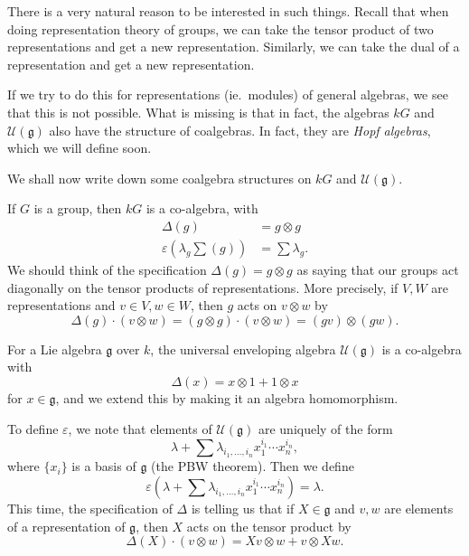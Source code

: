 \documentclass[a4paper]{article}
\begin{document}
There is a very natural reason to be interested in such things. Recall that when doing representation theory of groups, we can take the tensor product of two representations and get a new representation. Similarly, we can take the dual of a representation and get a new representation.

If we try to do this for representations (ie.\ modules) of general algebras, we see that this is not possible. What is missing is that in fact, the algebras $kG$ and $\mathcal{U}(\mathfrak{g})$ also have the structure of coalgebras. In fact, they are \emph{Hopf algebras}, which we will define soon.

We shall now write down some coalgebra structures on $kG$ and $\mathcal{U}(\mathfrak{g})$.
\begin{eg}
  If $G$ is a group, then $kG$ is a co-algebra, with
  \begin{align*}
    \Delta(g) &= g \otimes g\\
    \varepsilon\left(\lambda_g \sum(g)\right) &= \sum \lambda_g.
  \end{align*}
  We should think of the specification $\Delta (g) = g \otimes g$ as saying that our groups act diagonally on the tensor products of representations. More precisely, if $V, W$ are representations and $v \in V, w \in W$, then $g$ acts on $v \otimes w$ by
  \[
    \Delta(g) \cdot (v \otimes w) = (g \otimes g) \cdot (v \otimes w) = (gv) \otimes (gw).
  \]
\end{eg}

\begin{eg}
  For a Lie algebra $\mathfrak{g}$ over $k$, the universal enveloping algebra $\mathcal{U}(\mathfrak{g})$ is a co-algebra with
  \[
    \Delta(x) = x \otimes 1 + 1 \otimes x
  \]
  for $x \in \mathfrak{g}$, and we extend this by making it an algebra homomorphism.

  To define $\varepsilon$, we note that elements of $\mathcal{U}(\mathfrak{g})$ are uniquely of the form
  \[
    \lambda + \sum \lambda_{i_1, \ldots, i_n} x_1^{i_1} \cdots x_n^{i_n},
  \]
  where $\{x_i\}$ is a basis of $\mathfrak{g}$ (the PBW theorem). Then we define
  \[
    \varepsilon\left(\lambda + \sum \lambda_{i_1, \ldots, i_n} x_1^{i_1} \cdots x_n^{i_n}\right) = \lambda.
  \]
  This time, the specification of $\Delta$ is telling us that if $X \in \mathfrak{g}$ and $v, w$ are elements of a representation of $\mathfrak{g}$, then $X$ acts on the tensor product by
  \[
    \Delta(X) \cdot (v \otimes w) = Xv \otimes w + v \otimes Xw.
  \]
\end{eg}
\end{document}
